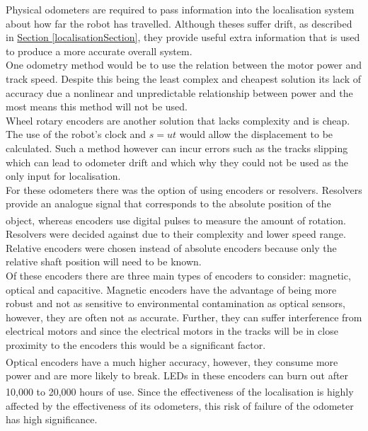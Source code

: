 \documentclass[11pt]{article}		%
\newcommand{\supercite}[1]{\textsuperscript{\cite{#1}}}		%
\newcommand{\sectref}[1]{\hyperref[#1]{Section \ref*{#1}}}     %
\begin{document}
	        Physical odometers are required to pass information into the localisation system about how far the robot has travelled. Although theses suffer drift, as described in \sectref{localisationSection}, they provide useful extra information that is used to produce a more accurate overall system.
\\ \hspace*{3ex}
 One odometry method would be to use the relation between the motor power and track speed. Despite this being the least complex and cheapest solution its lack of accuracy due a nonlinear and unpredictable relationship between power and the most means this method will not be used.
\\ \hspace*{3ex}
Wheel rotary encoders are another solution that lacks complexity and is cheap. The use of the robot's clock and $s=ut$ would allow the displacement to be calculated. Such a method however can incur errors such as the tracks slipping which can lead to odometer drift and which why they could not be used as the only input for localisation. 
\\ \hspace*{3ex}
For these odometers there was the option of using encoders or resolvers. Resolvers provide an analogue signal that corresponds to the absolute position of the object, whereas encoders use digital pulses to measure the amount of rotation.\supercite{Encoder_resolver} Resolvers were decided against due to their complexity and lower speed range. Relative encoders were chosen instead of absolute encoders because only the relative shaft position will need to be known.
\\ \hspace*{3ex}
Of these encoders there are three main types of encoders to consider: magnetic, optical and capacitive. Magnetic encoders have the advantage of being more robust and not as sensitive to environmental contamination as optical sensors, however, they are often not as accurate. Further, they can suffer interference from electrical motors and since the electrical motors in the tracks will be in close proximity to the encoders this would be a significant factor. 
\\ \hspace*{3ex}
Optical encoders have a much higher accuracy\supercite{Encoders}, however, they consume more power and are more likely to break. LEDs in these encoders can burn out after 10,000 to 20,000 hours of use.\supercite{Encoders} Since the effectiveness of the localisation is highly affected by the effectiveness of its odometers, this risk of failure of the odometer has high significance. 
\end{document}
